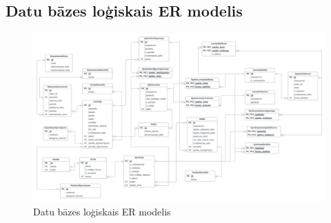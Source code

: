 \subsection{Datu bāzes loģiskais ER modelis}
\begin{figure}[htbp]
	\centering
	\includegraphics[width=\linewidth]{./src/img/LogiskaisERDModelis.png}
	\caption{Datu bāzes loģiskais ER modelis}
	\label{fig:logical-model}
\end{figure}
